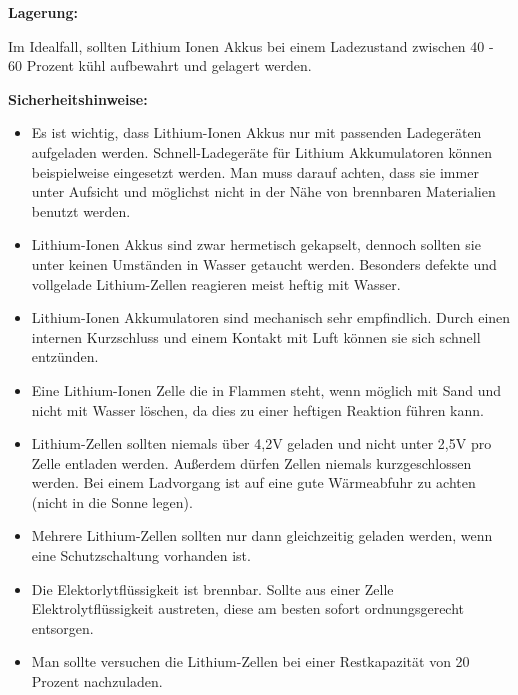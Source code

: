 \textbf{Lagerung:}

Im Idealfall, sollten Lithium Ionen Akkus bei einem Ladezustand zwischen 40 - 60 Prozent kühl aufbewahrt und gelagert werden.


\textbf{Sicherheitshinweise:}

\begin{itemize}
	\item{Es ist wichtig, dass Lithium-Ionen Akkus nur mit passenden Ladegeräten aufgeladen werden. Schnell-Ladegeräte für Lithium Akkumulatoren können beispielweise eingesetzt werden. Man muss darauf achten, dass sie immer unter Aufsicht und möglichst nicht in der Nähe von brennbaren Materialien benutzt werden.} \medskip\\

	\item {Lithium-Ionen Akkus sind zwar hermetisch gekapselt, dennoch sollten sie unter keinen Umständen in Wasser getaucht werden. Besonders defekte und  vollgelade Lithium-Zellen reagieren meist heftig mit Wasser.}\medskip\\
	
	\item {Lithium-Ionen Akkumulatoren sind mechanisch sehr empfindlich. Durch einen internen Kurzschluss und einem Kontakt mit Luft können sie sich schnell entzünden.}\medskip\\
	
	\item {Eine Lithium-Ionen Zelle die in Flammen steht, wenn möglich mit Sand und nicht mit Wasser löschen, da dies zu einer heftigen Reaktion führen kann.}\medskip\\
	
	\item {Lithium-Zellen sollten niemals über 4,2V geladen und nicht unter 2,5V pro Zelle entladen werden. Außerdem dürfen Zellen niemals kurzgeschlossen werden. Bei einem Ladvorgang ist auf eine gute Wärmeabfuhr zu achten (nicht in die Sonne legen).}\medskip\\
	
	\item {Mehrere Lithium-Zellen sollten nur dann gleichzeitig geladen werden, wenn eine Schutzschaltung vorhanden ist.}\medskip\\
	
	\item {Die Elektorlytflüssigkeit ist brennbar. Sollte aus einer Zelle Elektrolytflüssigkeit austreten, diese am besten sofort ordnungsgerecht entsorgen.}\medskip\\
	
	\item {Man sollte versuchen die Lithium-Zellen bei einer Restkapazität von 20 Prozent nachzuladen.}\medskip\\

\end{itemize}
\newpage

